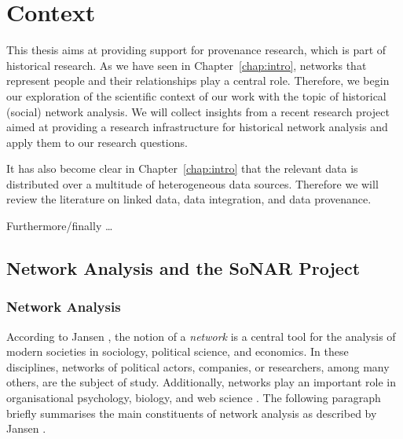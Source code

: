 \chapter{Context}
\label{chap:rel_work}
\label{chap:context}

This thesis aims at providing support for provenance research, which is part of historical research.
As we have seen in Chapter~\ref{chap:intro}, networks that represent
people and their relationships play a central role.
Therefore, we begin our exploration of the scientific context of our work
with the topic of historical (social) network analysis.
We will collect insights from a recent research project
aimed at providing a research infrastructure for historical network analysis
and apply them to our research questions.

It has also become clear in Chapter~\ref{chap:intro} that the relevant data is distributed 
over a multitude of heterogeneous data sources.
Therefore we will review the literature on linked data, data integration,
and data provenance.

Furthermore/finally \dots


\section{Network Analysis and the SoNAR Project}
\label{sec:HNA+SoNAR}


\subsection{Network Analysis}

According to Jansen \autocite*{Jansen2003},
the notion of a \emph{network} is a central tool for the analysis
of modern societies in sociology, political science, and economics.
In these disciplines, networks of political actors, companies, or researchers,
among many others, are the subject of study.
Additionally, networks play an important role
in organisational psychology, biology, and web science \autocite{WikiSNAGerman,WikiNetworkAnalysis}.
The following
paragraph briefly summarises the main constituents of network analysis
as described by Jansen \autocite*{Jansen2003}.

